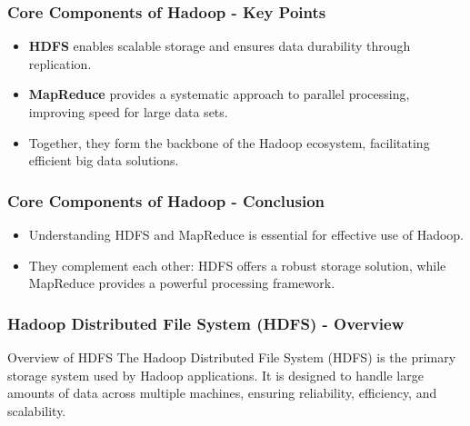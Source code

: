 \documentclass[aspectratio=169]{beamer}
\begin{document}
\begin{frame}[fragile]
    \frametitle{Core Components of Hadoop - Key Points}
    \begin{itemize}
        \item \textbf{HDFS} enables scalable storage and ensures data durability through replication.
        \item \textbf{MapReduce} provides a systematic approach to parallel processing, improving speed for large data sets.
        \item Together, they form the backbone of the Hadoop ecosystem, facilitating efficient big data solutions.
    \end{itemize}
\end{frame}

\begin{frame}[fragile]
    \frametitle{Core Components of Hadoop - Conclusion}
    \begin{itemize}
        \item Understanding HDFS and MapReduce is essential for effective use of Hadoop.
        \item They complement each other: HDFS offers a robust storage solution, while MapReduce provides a powerful processing framework.
    \end{itemize}
\end{frame}

\begin{frame}[fragile]
    \frametitle{Hadoop Distributed File System (HDFS) - Overview}
    \begin{block}{Overview of HDFS}
        The Hadoop Distributed File System (HDFS) is the primary storage system used by Hadoop applications. It is designed to handle large amounts of data across multiple machines, ensuring reliability, efficiency, and scalability.
    \end{block}
\end{frame}
\end{document}
